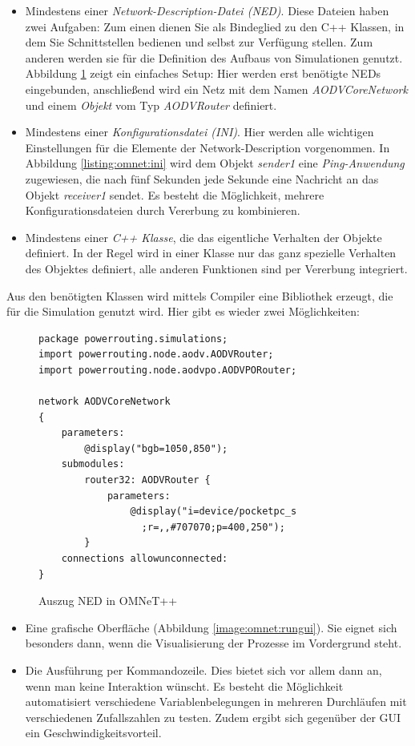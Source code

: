 \begin{itemize}
\item Mindestens einer \textit{Network-Description-Datei (NED)}. Diese Dateien haben zwei Aufgaben: Zum einen dienen Sie als Bindeglied zu den C++ Klassen, in dem Sie Schnittstellen bedienen und selbst zur Verfügung stellen. Zum anderen werden sie für die Definition des Aufbaus von Simulationen genutzt. Abbildung \ref{listing:omnet:ned} zeigt ein einfaches Setup: Hier werden erst benötigte NEDs eingebunden, anschließend wird ein Netz mit dem Namen \textit{AODVCoreNetwork} und einem \textit{Objekt} vom Typ \textit{AODVRouter} definiert.
\item Mindestens einer \textit{Konfigurationsdatei (INI)}. Hier werden alle wichtigen Einstellungen für die Elemente der Network-Description vorgenommen. In Abbildung \ref{listing:omnet:ini} wird dem Objekt \textit{sender1} eine \textit{Ping-Anwendung} zugewiesen, die nach fünf Sekunden jede Sekunde eine Nachricht an das Objekt \textit{receiver1} sendet. Es besteht die Möglichkeit, mehrere Konfigurationsdateien durch Vererbung zu kombinieren.
\item Mindestens einer \textit{C++ Klasse}, die das eigentliche Verhalten der Objekte definiert. In der Regel wird in einer Klasse nur das ganz spezielle Verhalten des Objektes definiert, alle anderen Funktionen sind per Vererbung integriert.
\end{itemize}

Aus den benötigten Klassen wird mittels Compiler eine Bibliothek erzeugt, die für die Simulation genutzt wird. Hier gibt es wieder zwei Möglichkeiten:

\begin{figure}
  \centering
  \footnotesize
  \begin{lstlisting}[frame=single]
package powerrouting.simulations;
import powerrouting.node.aodv.AODVRouter;
import powerrouting.node.aodvpo.AODVPORouter;

network AODVCoreNetwork
{
    parameters:
        @display("bgb=1050,850");
    submodules:
        router32: AODVRouter {
            parameters:
                @display("i=device/pocketpc_s
                  ;r=,,#707070;p=400,250");
        }
    connections allowunconnected:
}
  \end{lstlisting}
  \caption{Auszug NED in OMNeT++}
  \label{listing:omnet:ned}
\end{figure}

\begin{itemize}
\item Eine grafische Oberfläche (Abbildung \ref{image:omnet:rungui}). Sie eignet sich besonders dann, wenn die Visualisierung der Prozesse im Vordergrund steht.
\item Die Ausführung per Kommandozeile. Dies bietet sich vor allem dann an, wenn man keine Interaktion wünscht. Es besteht die Möglichkeit automatisiert verschiedene Variablenbelegungen in mehreren Durchläufen mit verschiedenen Zufallszahlen zu testen. Zudem ergibt sich gegenüber der GUI ein Geschwindigkeitsvorteil.
\end{itemize}

